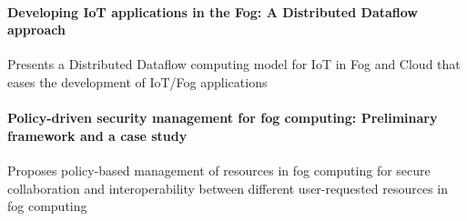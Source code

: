 \paragraph{Developing IoT applications in the Fog: A Distributed Dataflow approach} \cite{giang_developing_2015}
Presents a Distributed Dataflow computing model for IoT in Fog and Cloud that eases the development of IoT/Fog applications

\paragraph{Policy-driven security management for fog computing: Preliminary framework and a case study} \cite{dsouza_policy-driven_2014}
Proposes policy-based management of resources in fog computing for secure collaboration and interoperabil{}ity between different user-requested resources in fog computing

